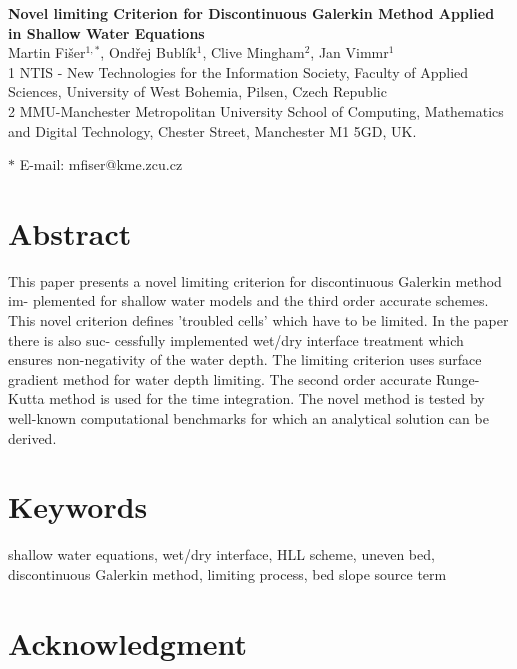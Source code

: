 \documentclass[12pt]{article}
\date{}
\begin{document}
\begin{flushleft}
{\Large
\textbf{Novel limiting Criterion for Discontinuous Galerkin Method Applied in Shallow Water Equations}
}
\\
Martin Fi\v{s}er$^{1,\ast}$,
Ondřej Bublík$^{1}$,
Clive Mingham$^{2}$,
Jan Vimmr$^{1}$
\\
1 NTIS - New Technologies for the Information Society, Faculty of Applied Sciences,
University of West Bohemia, Pilsen, Czech Republic
\\
2 MMU-Manchester Metropolitan University
School of Computing, Mathematics and Digital Technology,
Chester Street, Manchester M1 5GD, UK.

$\ast$ E-mail: mfiser@kme.zcu.cz
\end{flushleft}


\section*{Abstract} 

This paper presents a novel limiting criterion for discontinuous Galerkin method im-
plemented for shallow water models and the third order accurate schemes. This novel
criterion defines ’troubled cells’ which have to be limited. In the paper there is also suc-
cessfully implemented wet/dry interface treatment which ensures non-negativity of the
water depth. The limiting criterion uses surface gradient method for water depth limiting.
The second order accurate Runge-Kutta method is used for the time integration. The
novel method is tested by well-known computational benchmarks for which an analytical
solution can be derived.

\section*{Keywords}

shallow water equations, wet/dry interface, HLL scheme, 
uneven bed, discontinuous Galerkin method, limiting process, bed slope source term






%


\section*{Acknowledgment}


{}
\end{document}
